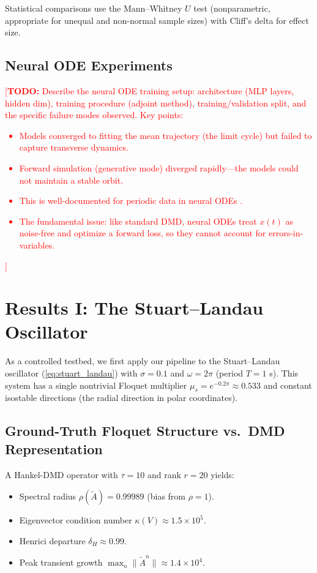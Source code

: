 \documentclass[12pt]{article}
\newcommand{\norm}[1]{\lVert #1 \rVert}
\newcommand{\Atilde}{\tilde{A}}
\newcommand{\todo}[1]{\textcolor{red}{[\textbf{TODO:} #1]}}
\begin{document}
Statistical comparisons use the Mann--Whitney $U$ test (nonparametric,
appropriate for unequal and non-normal sample sizes) with Cliff's delta
for effect size.

\subsection{Neural ODE Experiments}
\label{sec:neural_ode_methods}

\todo{Describe the neural ODE training setup: architecture (MLP layers,
hidden dim), training procedure (adjoint method), training/validation split,
and the specific failure modes observed. Key points:
\begin{itemize}
  \item Models converged to fitting the mean trajectory (the limit cycle)
  but failed to capture transverse dynamics.
  \item Forward simulation (generative mode) diverged rapidly---the models
  could not maintain a stable orbit.
  \item This is well-documented for periodic data in neural ODEs
  \citep{jordan2021neural, linot2023stabilized}.
  \item The fundamental issue: like standard DMD, neural ODEs treat $x(t)$
  as noise-free and optimize a forward loss, so they cannot account for
  errors-in-variables.
\end{itemize}}

\section{Results I: The Stuart--Landau Oscillator}
\label{sec:results_sl}

As a controlled testbed, we first apply our pipeline to the Stuart--Landau
oscillator (\cref{eq:stuart_landau}) with $\sigma = 0.1$ and $\omega = 2\pi$
(period $T = 1$ s). This system has a single nontrivial Floquet multiplier
$\mu_s = e^{-0.2\pi} \approx 0.533$ and constant isostable directions
(the radial direction in polar coordinates).

\subsection{Ground-Truth Floquet Structure vs.\ DMD Representation}

A Hankel-DMD operator with $\tau = 10$ and rank $r = 20$ yields:
\begin{itemize}
  \item Spectral radius $\rho(\Atilde) = 0.99989$ (bias from $\rho = 1$).
  \item Eigenvector condition number $\kappa(V) \approx 1.5 \times 10^5$.
  \item Henrici departure $\delta_H \approx 0.99$.
  \item Peak transient growth $\max_n \norm{\Atilde^n} \approx 1.4 \times 10^4$.
\end{itemize}
\end{document}
